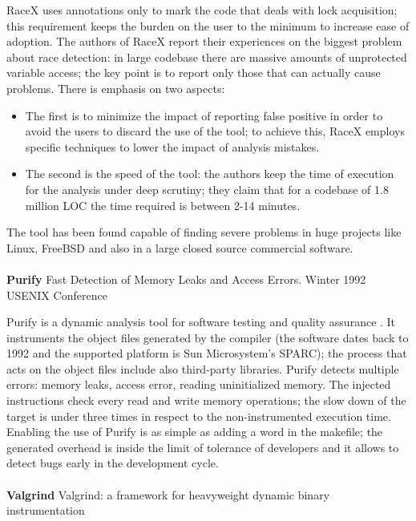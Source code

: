 RaceX uses annotations only to mark the code that deals with lock acquisition; this requirement keeps the burden on the user to the minimum to increase ease of adoption. The authors of RaceX report their experiences on the biggest problem about race detection: in large codebase there are massive amounts of unprotected variable access; the key point is to report only those that can actually cause problems. There is emphasis on two aspects:
\begin{itemize}
    \item The first is to minimize the impact of reporting false positive in order to avoid the users to discard the use of the tool; to achieve this, RaceX employs specific techniques to lower the impact of analysis mistakes.
    \item The second is the speed of the tool: the authors keep the time of execution for the analysis under deep scrutiny; they claim that for a codebase of 1.8 million LOC the time required is between 2-14 minutes.  
\end{itemize}
The tool has been found capable of finding severe problems in huge projects like Linux, FreeBSD and also in a large closed source commercial software.
\\
\\
\textbf{Purify} \cite{hastings1992fast} Fast Detection of Memory Leaks and Access Errors. Winter 1992 USENIX Conference
 
 Purify is a dynamic analysis tool for software testing and quality assurance . 
 It instruments the object files generated by the compiler (the software dates back to 1992 and the supported platform is Sun Microsystem's SPARC); the process that acts on the object files  include also third-party libraries. 
 Purify detects multiple errors: memory leaks, access error, reading uninitialized memory. The injected instructions check every read and write memory operations; the slow down of the target is under three times in respect to the non-instrumented execution time. 
 Enabling the use of Purify is as simple as adding a word in the makefile; the generated overhead is inside the limit of tolerance of developers and it allows to detect bugs early in the development cycle.
\\
\\
\textbf{Valgrind} \cite{nethercote2007valgrind} Valgrind: a framework for heavyweight dynamic binary instrumentation

